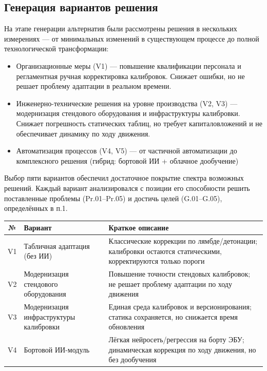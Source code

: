 \documentclass[14pt, a4paper]{extarticle}
\begin{document}
	\subsection{Генерация вариантов решения}
	На этапе генерации альтернатив были рассмотрены решения в нескольких измерениях — от минимальных изменений в существующем процессе до полной технологической трансформации:
	\begin{itemize}
		\item Организационные меры (V1) — повышение квалификации персонала и регламентная ручная корректировка калибровок. Снижает ошибки, но не решает проблему адаптации в реальном времени.
		
		\item Инженерно-технические решения на уровне производства (V2, V3) — модернизация стендового оборудования и инфраструктуры калибровки. Снижает погрешность статических таблиц, но требует капиталовложений и не обеспечивает динамику по ходу движения.
		
		\item Автоматизация процессов (V4, V5) — от частичной автоматизации до комплексного решения (гибрид: бортовой ИИ + облачное дообучение)
	\end{itemize}
	
	Выбор пяти вариантов обеспечил достаточное покрытие спектра возможных решений. Каждый вариант анализировался с позиции его способности решить поставленные проблемы (Pr.01–Pr.05) и достичь целей (G.01–G.05), определённых в п.1.
	
	\vspace{\parindent}
	\noindent
	\begin{minipage}{\textwidth}
		\label{tab:variants}
		\begin{tabularx}{\textwidth}{|c|X|X|}
			\hline
			\textbf{№} & \textbf{Вариант} & \textbf{Краткое описание} \\
			\hline
			V1 & Табличная адаптация (без ИИ) & Классические коррекции по лямбде/детонации; калибровки остаются статическими, корректируются только пороги \\
			\hline
			V2 & Модернизация стендового оборудования & Повышение точности стендовых калибровок; не решает проблему адаптации по ходу движения \\
			\hline
			V3 & Модернизация инфраструктуры калибровки & Единая среда калибровок и версионирования; статика сохраняется, но снижается время обновления \\
			\hline
			V4 & Бортовой ИИ-модуль & Лёгкая нейросеть/регрессия на борту ЭБУ; динамическая коррекция по ходу движения, но без дообучения \\
			\hline
		\end{tabularx}
	\end{minipage}
	\vspace{\parindent}
	
\end{document}
